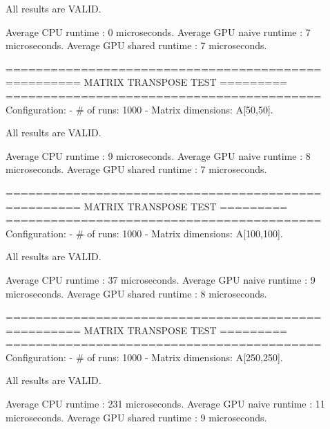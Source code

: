 All results are VALID.

Average CPU runtime        : 0 microseconds.
Average GPU naive runtime  : 7 microseconds.
Average GPU shared runtime : 7 microseconds.

==========================================
========== MATRIX TRANSPOSE TEST =========
==========================================
Configuration:
 - # of runs: 1000
 - Matrix dimensions: A[50,50].

All results are VALID.

Average CPU runtime        : 9 microseconds.
Average GPU naive runtime  : 8 microseconds.
Average GPU shared runtime : 7 microseconds.

==========================================
========== MATRIX TRANSPOSE TEST =========
==========================================
Configuration:
 - # of runs: 1000
 - Matrix dimensions: A[100,100].

All results are VALID.

Average CPU runtime        : 37 microseconds.
Average GPU naive runtime  : 9 microseconds.
Average GPU shared runtime : 8 microseconds.

==========================================
========== MATRIX TRANSPOSE TEST =========
==========================================
Configuration:
 - # of runs: 1000
 - Matrix dimensions: A[250,250].

All results are VALID.

Average CPU runtime        : 231 microseconds.
Average GPU naive runtime  : 11 microseconds.
Average GPU shared runtime : 9 microseconds.
